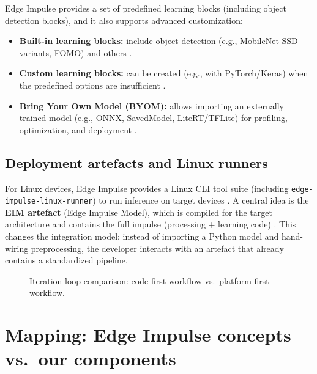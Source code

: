 \noindent
Edge Impulse provides a set of predefined learning blocks (including object detection blocks), and it also supports advanced customization:
\begin{itemize}
	\item \textbf{Built-in learning blocks:} include object detection (e.g., MobileNet SSD variants, FOMO) and others \cite{EdgeImpulseLearningBlocks}.
	\item \textbf{Custom learning blocks:} can be created (e.g., with PyTorch/Keras) when the predefined options are insufficient \cite{EdgeImpulseLearningBlocks}.
	\item \textbf{Bring Your Own Model (BYOM):} allows importing an externally trained model (e.g., ONNX, SavedModel, LiteRT/TFLite) for profiling, optimization, and deployment \cite{EdgeImpulseBYOM}.
\end{itemize}

\subsection{Deployment artefacts and Linux runners}

\noindent
For Linux devices, Edge Impulse provides a Linux CLI tool suite (including \texttt{edge-impulse-linux-runner}) to run inference on target devices \cite{EdgeImpulseLinuxCLI}.
A central idea is the \textbf{EIM artefact} (Edge Impulse Model), which is compiled for the target architecture and contains the full impulse (processing + learning code) \cite{EdgeImpulseLinuxEIM}.
This changes the integration model: instead of importing a Python model and hand-wiring preprocessing, the developer interacts with an artefact that already contains a standardized pipeline.

\begin{figure}[htbp]
	\centering
	
	\caption{Iteration loop comparison: code-first workflow vs.\ platform-first workflow.}
	\label{fig:edge_impulse_lifecycle_loop}
\end{figure}

\section{Mapping: Edge Impulse concepts vs.\ our components}
\label{sec:edge_impulse_mapping}

